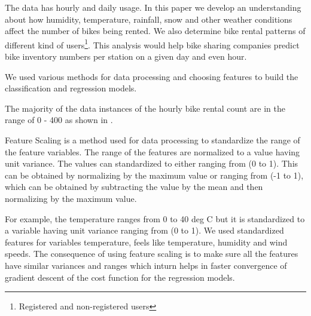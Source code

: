 \documentclass[12pt]{article}
\newcommand{\figwidth}{5.5in}
\begin{document}

The data has hourly and daily usage. In this paper we develop an understanding
about how humidity, temperature, rainfall, snow and other weather conditions
affect the number of bikes being rented. We also determine bike rental patterns
of different kind of users\footnote{Registered and non-registered users}. This
analysis would help bike sharing companies predict bike inventory numbers per
station on a given day and even hour.



We used various methods for data processing and choosing features to build the
classification and regression models.

The majority of the data instances of the hourly bike rental count are in the
range of 0 - 400 as shown in .

\ddfigure{\figwidth}{freq-histogram}{Bike Rentals Histogram}



Feature Scaling is a method used for data processing to standardize the range
of the feature variables. The range of the features are normalized to a value
having unit variance. The values can standardized to either ranging from (0 to
1).  This can be obtained by normalizing by the maximum value or ranging from
(-1 to 1), which can be obtained by subtracting the value by the mean and then
normalizing by the maximum value.

For example, the temperature ranges from 0 to 40 deg C but it is standardized
to a variable having unit variance ranging from (0 to 1). We used standardized
features for variables temperature, feels like temperature, humidity and wind
speeds. The consequence of using feature scaling is to make sure all the
features have similar variances and ranges which inturn helps in faster
convergence of gradient descent of the cost function for the regression models.

\end{document}
